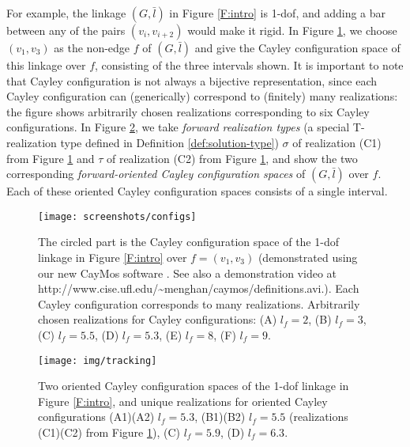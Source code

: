 \documentclass[secthm,amsthm,english]{article}
\theoremstyle{definition}
\theoremstyle{remark}
\begin{document}
For example, the linkage $(G,\bar{l})$ in Figure \ref{F:intro} is 1-dof, 
and adding a bar between any of the pairs $(v_i, v_{i+2})$ would make it rigid.
In Figure \ref{F:interval},  
we choose $(v_1,v_3)$ as the non-edge $f$ of $(G,\bar{l})$ and
give the Cayley configuration space of this linkage over $f$,
consisting of the three intervals shown. 
It is important to note that Cayley configuration is not always a bijective representation, 
since each Cayley configuration can (generically) correspond to (finitely) many realizations: 
the figure shows arbitrarily chosen realizations corresponding to six Cayley configurations.
In Figure \ref{F:tracking}, 
we take \emph{forward realization types} (a special T-realization type defined in Definition \ref{def:solution-type})
$\sigma$ of realization (C1) from Figure \ref{F:interval} and $\tau$ of realization (C2) from Figure \ref{F:interval}, 
and show the two corresponding \emph{forward-oriented Cayley configuration spaces} of $(G,\bar{l})$
over $f$.  
Each of these oriented Cayley configuration spaces consists of a single interval. 




\begin{figure}[h]

	\begin{centering}
	\texttt{[image: screenshots/configs]}
	\par\end{centering}
	
	\caption{
	The circled part is the Cayley configuration space of the 1-dof linkage in Figure \ref{F:intro} over $f = (v_1,v_3)$ 
	(demonstrated using our new CayMos software \protect\cite{bib:caymos}. 
	See also a demonstration video at http://www.cise.ufl.edu/\~{}menghan/caymos/definitions.avi.).  
	Each Cayley configuration corresponds to many realizations. 
	Arbitrarily chosen realizations for Cayley configurations: (A) $l_f=2$, (B) $l_f=3$, (C) $l_f=5.5$, (D) $l_f = 5.3$, (E) $l_f = 8$, (F) $l_f = 9$. }

\label{F:interval} 
\end{figure}

\begin{figure}[h]
	
	\begin{centering}
	\texttt{[image: img/tracking]}
	\par\end{centering}
	
	\caption{Two oriented Cayley configuration spaces of the 1-dof linkage in Figure \ref{F:intro}, and   
unique realizations for oriented Cayley configurations (A1)(A2) $l_f = 5.3$, (B1)(B2) $l_f = 5.5$ (realizations (C1)(C2) from Figure \ref{F:interval}), (C) $l_f = 5.9$, (D) $l_f = 6.3$. }

\label{F:tracking} 
\end{figure}
\end{document}
